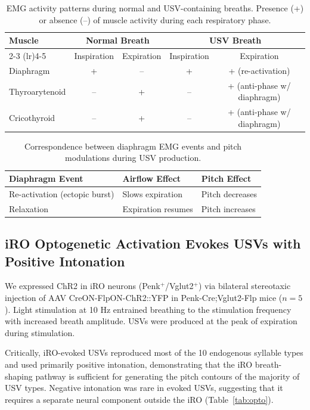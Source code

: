 \documentclass[11pt]{article}
\begin{document}
\begin{table}[H]
\centering
\caption{EMG activity patterns during normal and USV-containing breaths. Presence (+) or absence (--) of muscle activity during each respiratory phase.}
\label{tab:emg}
\begin{tabular}{lcccc}
\toprule
\textbf{Muscle} & \multicolumn{2}{c}{\textbf{Normal Breath}} & \multicolumn{2}{c}{\textbf{USV Breath}} \\
\cmidrule(lr){2-3} \cmidrule(lr){4-5}
 & Inspiration & Expiration & Inspiration & Expiration \\
\midrule
Diaphragm & + & -- & + & + (re-activation) \\
Thyroarytenoid & -- & + & -- & + (anti-phase w/ diaphragm) \\
Cricothyroid & -- & + & -- & + (anti-phase w/ diaphragm) \\
\bottomrule
\end{tabular}
\end{table}

\begin{table}[H]
\centering
\caption{Correspondence between diaphragm EMG events and pitch modulations during USV production.}
\label{tab:emg_pitch}
\begin{tabular}{lll}
\toprule
\textbf{Diaphragm Event} & \textbf{Airflow Effect} & \textbf{Pitch Effect} \\
\midrule
Re-activation (ectopic burst) & Slows expiration & Pitch decreases \\
Relaxation & Expiration resumes & Pitch increases \\
\bottomrule
\end{tabular}
\end{table}

\subsection{iRO Optogenetic Activation Evokes USVs with Positive Intonation}

We expressed ChR2 in iRO neurons (Penk$^+$/Vglut2$^+$) via bilateral stereotaxic injection of AAV CreON-FlpON-ChR2::YFP in Penk-Cre;Vglut2-Flp mice ($n = 5$). Light stimulation at 10 Hz entrained breathing to the stimulation frequency with increased breath amplitude. USVs were produced at the peak of expiration during stimulation.

Critically, iRO-evoked USVs reproduced most of the 10 endogenous syllable types and used primarily positive intonation, demonstrating that the iRO breath-shaping pathway is sufficient for generating the pitch contours of the majority of USV types. Negative intonation was rare in evoked USVs, suggesting that it requires a separate neural component outside the iRO (Table~\ref{tab:opto}).
\end{document}
